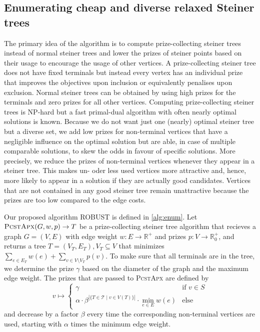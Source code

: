 \documentclass{bioinfo}
\begin{document}
\subsection{Enumerating cheap and diverse relaxed Steiner trees}\label{sec:algo}
The primary idea of the algorithm is to compute prize-collecting steiner trees instead of normal steiner trees and lower the prizes of steiner points based on their usage to encourage the usage of other vertices.
A prize-collecting steiner tree does not have fixed terminals but instead every vertex has an individual prize that improves the objectives upon inclusion or equivalently penalises upon exclusion.
Normal steiner trees can be obtained by using high prizes for the terminals and zero prizes for all other vertices.
Computing prize-collecting steiner trees is NP-hard but a fast primal-dual algorithm with often nearly optimal solutions is known.
Because we do not want just one (nearly) optimal steiner tree but a diverse set, we add low prizes for non-terminal vertices that have a negligible influence on the optimal solution but are able, in case of multiple comparable solutions, to skew the odds in favour of specific solutions.
More precisely, we reduce the prizes of non-terminal vertices whenever they appear in a steiner tree.
This makes un- oder less used vertices more attractive and, hence, more likely to appear in a solution if they are actually good candidates.
Vertices that are not contained in any good steiner tree remain unattractive because the prizes are too low compared to the edge costs.

Our proposed algorithm ROBUST is defined in \cref{alg:enum}.
Let $\textsc{PcstApx}(G,w,p)\rightarrow T$ be a prize-collecting steiner tree algorithm that recieves a graph $G=(V,E)$ with edge weight $w: E\rightarrow \mathbb{R}^+$ and prizes $p: V\rightarrow \mathbb{R}^+_0$, and returns a tree $T=(V_T, E_T), V_T\subseteq V$ that minimizes $\sum_{e\in E_T} w(e) + \sum_{v\in V\setminus V_T} p(v)$.
To make sure that all terminals are in the tree, we determine the prize $\gamma$ based on the diameter of the graph and the maximum edge weight. 
The prizes that are passed to \textsc{PcstApx} are defined by
\[v \mapsto \begin{cases} \gamma & \text{if }v\in S \\ \alpha\cdot \beta^{|\{T\in \mathcal{T} \mid v \in V(T)\}|} \cdot \min_{e\in E} w(e) & \text{else} \end{cases}\]
and decrease by a factor $\beta$ every time the corresponding non-terminal vertices are used, starting with $\alpha$ times the minimum edge weight.
\end{document}
